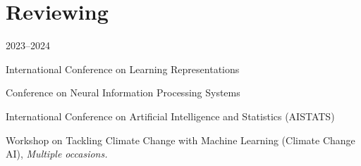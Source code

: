 \section*{Reviewing}
\begin{labeling}{2023--2024}
    \item [2025] International Conference on Learning Representations
    \item [2024] Conference on Neural Information Processing Systems
    \item [2023--2024] International Conference on Artificial Intelligence and Statistics (AISTATS)
    \item [2024] Workshop on Tackling Climate Change with Machine Learning (Climate Change AI), \textit{Multiple occasions.}
\end{labeling}
